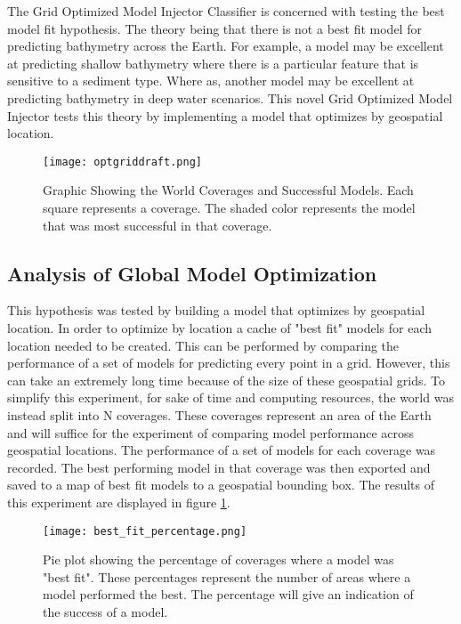 The Grid Optimized Model Injector Classifier is concerned with testing the best model fit hypothesis.
The theory being that there is not a best fit model for predicting bathymetry across the Earth.
For example, a model may be excellent at predicting shallow bathymetry where there is a particular feature that is sensitive to a sediment type.
Where as, another model may be excellent at predicting bathymetry in deep water scenarios.
This novel Grid Optimized Model Injector tests this theory by implementing a model that optimizes by geospatial location.

\begin{figure}[h]
    \centering
    \texttt{[image: optgriddraft.png]}
    \caption{Graphic Showing the World Coverages and Successful Models.
    Each square represents a coverage.
    The shaded color represents the model that was most successful in that coverage.}
    \label{fig:coveragegrid}
\end{figure}

\subsection{Analysis of Global Model Optimization}
This hypothesis was tested by building a model that optimizes by geospatial location.
In order to optimize by location a cache of "best fit" models for each location needed to be created.
This can be performed by comparing the performance of a set of models for predicting every point in a grid.
However, this can take an extremely long time because of the size of these geospatial grids.
To simplify this experiment, for sake of time and computing resources, the world was instead split into N coverages.
These coverages represent an area of the Earth and will suffice for the experiment of comparing model performance across geospatial locations.
The performance of a set of models for each coverage was recorded.
The best performing model in that coverage was then exported and saved to a map of best fit models to a geospatial bounding box.
The results of this experiment are displayed in figure \ref{fig:coveragegrid}.

\begin{figure}[h]
    \centering
    \texttt{[image: best\_fit\_percentage.png]}
    \caption{Pie plot showing the percentage of coverages where a model was "best fit". These percentages represent the number of areas where a model performed the best. 
    The percentage will give an indication of the success of a model.}
    \label{fig:pie_best_fit}
\end{figure}

